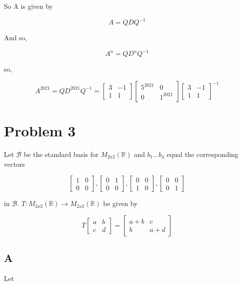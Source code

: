 \documentclass{article}
\begin{document}
So A is given by 

\[ A = QDQ^{-1} \]

And so,

\[ A^n = QD^nQ^{-1} \]

so,

\[ A^{2021} = QD^{2021}Q^{-1} = \begin{bmatrix} 3 & -1 \\ 1 & 1 \end{bmatrix} \begin{bmatrix} 5^{2021} & 0 \\ 0 & 1^{2021} \end{bmatrix} \begin{bmatrix} 3 & -1 \\ 1 & 1 \end{bmatrix}^{-1} \]

\section*{Problem 3}
Let $\mathcal{B}$ be the standard basis for $M_{2x2}(\mathbb{R})$ and $b_1$...$b_4$ equal the corresponding vectors 

\[ \begin{bmatrix} 1 & 0 \\ 0 & 0 \end{bmatrix}, \begin{bmatrix} 0 & 1 \\ 0 & 0 \end{bmatrix}, \begin{bmatrix} 0 & 0 \\ 1 & 0 \end{bmatrix}, \begin{bmatrix} 0 & 0 \\ 0 & 1 \end{bmatrix} \]

in $\mathcal{B}$. $T: M_{2x2}(\mathbb{R}) \rightarrow M_{2x2}(\mathbb{R})$ be given by

\[ T\begin{bmatrix} a & b \\ c & d \end{bmatrix} = \begin{bmatrix} a+b & c \\ b & a+d \end{bmatrix} \]

\subsection*{A}
Let
\end{document}
